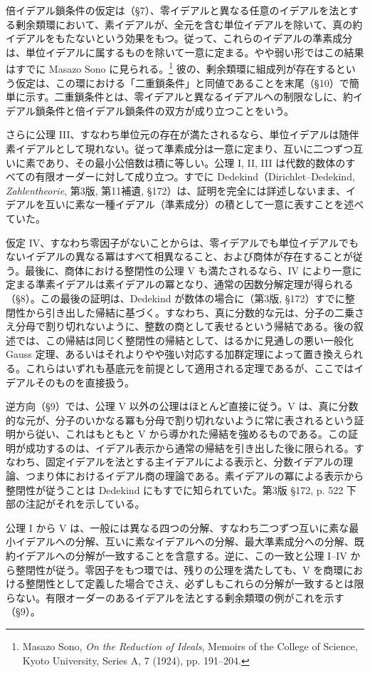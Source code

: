 \documentclass[11pt]{article}
\begin{document}
倍イデアル鎖条件の仮定は（§7）、零イデアルと異なる任意のイデアルを法とする剰余類環において、素イデアルが、全元を含む単位イデアルを除いて、真の約イデアルをもたないという効果をもつ。従って、これらのイデアルの準素成分は、単位イデアルに属するものを除いて一意に定まる。やや弱い形ではこの結果はすでに Masazo Sono に見られる。\footnote{Masazo Sono, \emph{On the Reduction of Ideals}, Memoirs of the College of Science, Kyoto University, Series A, 7 (1924), pp. 191--204.} 彼の、剰余類環に組成列が存在するという仮定は、この環における「二重鎖条件」と同値であることを末尾（§10）で簡単に示す。二重鎖条件とは、零イデアルと異なるイデアルへの制限なしに、約イデアル鎖条件と倍イデアル鎖条件の双方が成り立つことをいう。

さらに公理 III、すなわち単位元の存在が満たされるなら、単位イデアルは随伴素イデアルとして現れない。従って準素成分は一意に定まり、互いに二つずつ互いに素であり、その最小公倍数は積に等しい。公理 I, II, III は代数的数体のすべての有限オーダーに対して成り立つ。すでに Dedekind（Dirichlet--Dedekind, \emph{Zahlentheorie}, 第3版, 第11補遺, §172）は、証明を完全には詳述しないまま、イデアルを互いに素な一種イデアル（準素成分）の積として一意に表すことを述べていた。

仮定 IV、すなわち零因子がないことからは、零イデアルでも単位イデアルでもないイデアルの異なる冪はすべて相異なること、および商体が存在することが従う。最後に、商体における整閉性の公理 V も満たされるなら、IV により一意に定まる準素イデアルは素イデアルの冪となり、通常の因数分解定理が得られる（§8）。この最後の証明は、Dedekind が数体の場合に（第3版, §172）すでに整閉性から引き出した帰結に基づく。すなわち、真に分数的な元は、分子の二乗さえ分母で割り切れないように、整数の商として表せるという帰結である。後の叙述では、この帰結は同じく整閉性の帰結として、はるかに見通しの悪い一般化 Gauss 定理、あるいはそれよりやや強い対応する加群定理によって置き換えられる。これらはいずれも基底元を前提として適用される定理であるが、ここではイデアルそのものを直接扱う。

逆方向（§9）では、公理 V 以外の公理はほとんど直接に従う。V は、真に分数的な元が、分子のいかなる冪も分母で割り切れないように常に表されるという証明から従い、これはもともと V から導かれた帰結を強めるものである。この証明が成功するのは、イデアル表示から通常の帰結を引き出した後に限られる。すなわち、固定イデアルを法とする主イデアルによる表示と、分数イデアルの理論、つまり体におけるイデアル商の理論である。素イデアルの冪による表示から整閉性が従うことは Dedekind にもすでに知られていた。第3版 §172, p. 522 下部の注記がそれを示している。

公理 I から V は、一般には異なる四つの分解、すなわち二つずつ互いに素な最小イデアルへの分解、互いに素なイデアルへの分解、最大準素成分への分解、既約イデアルへの分解が一致することを含意する。逆に、この一致と公理 I--IV から整閉性が従う。零因子をもつ環では、残りの公理を満たしても、V を商環における整閉性として定義した場合でさえ、必ずしもこれらの分解が一致するとは限らない。有限オーダーのあるイデアルを法とする剰余類環の例がこれを示す（§9）。
\end{document}
